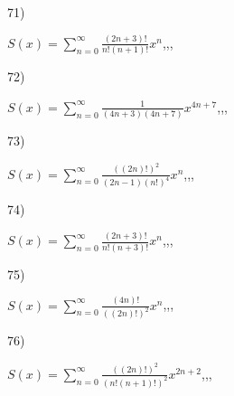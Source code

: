 \documentclass[11pt, ukrainian]{article}
\begin{document}
\par
\newpage
71) \space 
{%
{$S(x)=\sum\limits_{n=0}^{\infty}{\frac{(2n+3)!}{n!(n+1)!}}{x^{n}}$},,, \par \smallskip  
}
\par
\vspace{0.9cm}
72) \space 
{%
{$S(x)=\sum\limits_{n=0}^{\infty}{\frac{1}{(4n+3)(4n+7)}}{x^{{4n+7}}}$},,, \par \smallskip  
}
\par
\vspace{0.9cm}
73) \space 
{%
{$S(x)=\sum\limits_{n=0}^{\infty}{\frac{((2n)!)^2}{(2n-1)(n!)^4}}{x^{{n}}}$},,, \par \smallskip  
}
\par
\vspace{0.9cm}
74) \space 
{%
{$S(x)=\sum\limits_{n=0}^{\infty}{\frac{(2n+3)!}{n!(n+3)!}}{x^{n}}$},,, \par \smallskip  
}
\par
\vspace{0.9cm}
75) \space 
{%
{$S(x)=\sum\limits_{n=0}^{\infty}{\frac{(4n)!}{{((2n)!)^2}}}{x^{{n}}}$},,, \par \smallskip  
}
\par
\vspace{0.9cm}
76) \space 
{%
{$S(x)=\sum\limits_{n=0}^{\infty}{\frac{((2n)!)^2}{(n!(n+1)!)^2}}{x^{{2n+2}}}$},,, \par \smallskip  
}
\end{document}
